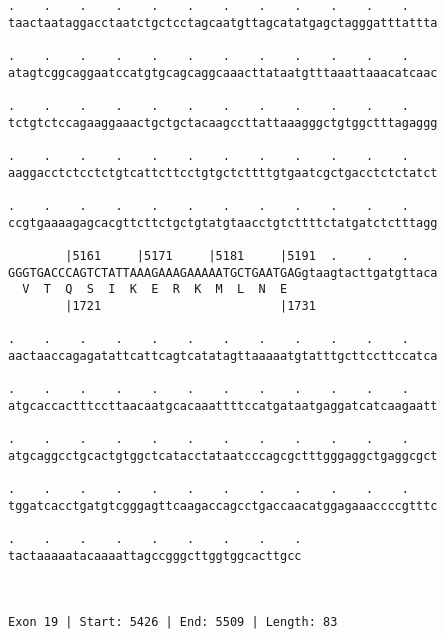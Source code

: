 \documentclass{article}
\begin{document}
\begin{Verbatim}
.    .    .    .    .    .    .    .    .    .    .    .    
taactaataggacctaatctgctcctagcaatgttagcatatgagctagggatttattta
                                                            
.    .    .    .    .    .    .    .    .    .    .    .    
atagtcggcaggaatccatgtgcagcaggcaaacttataatgtttaaattaaacatcaac
                                                            
.    .    .    .    .    .    .    .    .    .    .    .    
tctgtctccagaaggaaactgctgctacaagccttattaaagggctgtggctttagaggg
                                                            
.    .    .    .    .    .    .    .    .    .    .    .    
aaggacctctcctctgtcattcttcctgtgctcttttgtgaatcgctgacctctctatct
                                                            
.    .    .    .    .    .    .    .    .    .    .    .    
ccgtgaaaagagcacgttcttctgctgtatgtaacctgtcttttctatgatctctttagg
                                                            
        |5161     |5171     |5181     |5191  .    .    .    
GGGTGACCCAGTCTATTAAAGAAAGAAAAATGCTGAATGAGgtaagtacttgatgttaca
  V  T  Q  S  I  K  E  R  K  M  L  N  E                     
        |1721                         |1731                 
  
.    .    .    .    .    .    .    .    .    .    .    .    
aactaaccagagatattcattcagtcatatagttaaaaatgtatttgcttccttccatca
                                                            
.    .    .    .    .    .    .    .    .    .    .    .    
atgcaccactttccttaacaatgcacaaattttccatgataatgaggatcatcaagaatt
                                                            
.    .    .    .    .    .    .    .    .    .    .    .    
atgcaggcctgcactgtggctcatacctataatcccagcgctttgggaggctgaggcgct
                                                            
.    .    .    .    .    .    .    .    .    .    .    .    
tggatcacctgatgtcgggagttcaagaccagcctgaccaacatggagaaaccccgtttc
                                                            
.    .    .    .    .    .    .    .    .
tactaaaaatacaaaattagccgggcttggtggcacttgcc
                                         
                                         
 
Exon 19 | Start: 5426 | End: 5509 | Length: 83




\end{Verbatim}
\end{document}
